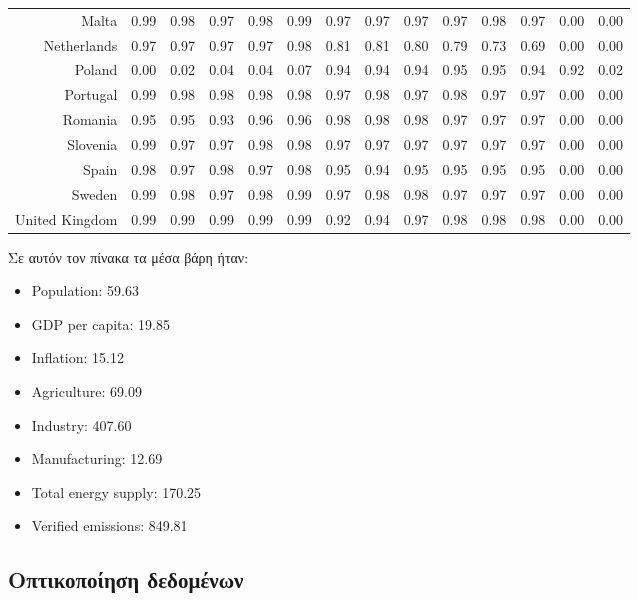 \documentclass[a4paper,twoside,10pt]{article}
\begin{document}
\begin{table}[H]
\begin{tabular}{r|rrrrr|rrrrrr|rr}
			Malta & 0.99 & 0.98 & 0.97 & 0.98 & 0.99 & 0.97 & 0.97 & 0.97 & 0.97 & 0.98 & 0.97 & 0.00 & 0.00 \\ 
			Netherlands & 0.97 & 0.97 & 0.97 & 0.97 & 0.98 & 0.81 & 0.81 & 0.80 & 0.79 & 0.73 & 0.69 & 0.00 & 0.00 \\ 
			\rowcolor{cyan} Poland & 0.00 & 0.02 & 0.04 & 0.04 & 0.07 & 0.94 & 0.94 & 0.94 & 0.95 & 0.95 & 0.94 & 0.92 & 0.02 \\ 
			Portugal & 0.99 & 0.98 & 0.98 & 0.98 & 0.98 & 0.97 & 0.98 & 0.97 & 0.98 & 0.97 & 0.97 & 0.00 & 0.00 \\ 
			Romania & 0.95 & 0.95 & 0.93 & 0.96 & 0.96 & 0.98 & 0.98 & 0.98 & 0.97 & 0.97 & 0.97 & 0.00 & 0.00 \\ 
			Slovenia & 0.99 & 0.97 & 0.97 & 0.98 & 0.98 & 0.97 & 0.97 & 0.97 & 0.97 & 0.97 & 0.97 & 0.00 & 0.00 \\ 
			Spain & 0.98 & 0.97 & 0.98 & 0.97 & 0.98 & 0.95 & 0.94 & 0.95 & 0.95 & 0.95 & 0.95 & 0.00 & 0.00 \\ 
			Sweden & 0.99 & 0.98 & 0.97 & 0.98 & 0.99 & 0.97 & 0.98 & 0.98 & 0.97 & 0.97 & 0.97 & 0.00 & 0.00 \\ 
			United Kingdom & 0.99 & 0.99 & 0.99 & 0.99 & 0.99 & 0.92 & 0.94 & 0.97 & 0.98 & 0.98 & 0.98 & 0.00 & 0.00 \\ 
			\hline
		\end{tabular}
	\end{table}
	Σε αυτόν τον πίνακα τα μέσα βάρη ήταν:
	\begin{itemize}
		\item Population: 59.63
		\item GDP per capita: 19.85
		\item Inflation: 15.12
		\item Agriculture: 69.09
		\item Industry: 407.60
		\item Manufacturing: 12.69
		\item Total energy supply: 170.25
		\item Verified emissions: 849.81\\
	\end{itemize}
\newpage
\subsection{Οπτικοποίηση δεδομένων}
\end{document}
